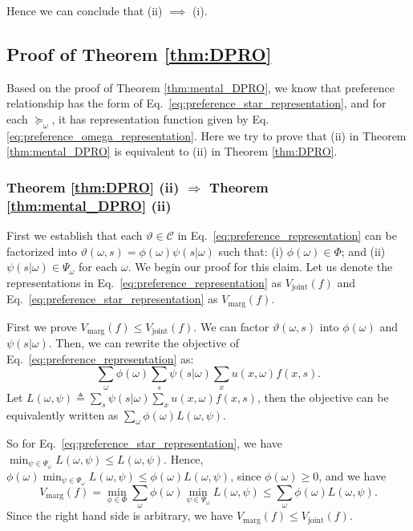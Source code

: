 \documentclass[11pt,oneside]{article}
\theoremstyle{plain}
\theoremstyle{plain}
\theoremstyle{plain}
\theoremstyle{plain}
\theoremstyle{plain}
\theoremstyle{definition}
\theoremstyle{definition}
\theoremstyle{remark}
\theoremstyle{plain}
\newcommand{\pfo}{\pf_\omega}
\newcommand{\pf}{\succeq}
\begin{document}
Hence we can conclude that (ii) $\implies$ (i).


\subsection{Proof of Theorem \ref{thm:DPRO}}
Based on the proof of Theorem \ref{thm:mental_DPRO}, we know that preference relationship has the form of Eq.~\eqref{eq:preference_star_representation}, and for each $\pfo$, it has representation function given by
Eq.\eqref{eq:preference_omega_representation}. Here we try to prove that (ii) in Theorem \ref{thm:mental_DPRO} is equivalent to (ii) in Theorem \ref{thm:DPRO}.

\subsubsection{Theorem \ref{thm:DPRO} (ii) $\Rightarrow$ Theorem \ref{thm:mental_DPRO} (ii)}

First we establish that each $\vartheta \in \mathcal{C}$ in Eq.~\eqref{eq:preference_representation} can be factorized into $\vartheta(\omega,s) = \phi(\omega)\psi(s|\omega)$ such that: (i) $\phi(\omega) \in \Phi$; and (ii) $\psi(s|\omega) \in \Psi_\omega$ for each $\omega$.
We begin our proof for this claim. Let us denote the representations in Eq.~\eqref{eq:preference_representation} as $V_{\text{joint}}(f)$ and Eq.~\eqref{eq:preference_star_representation} as $V_{\text{marg}}(f)$.

First we prove $V_{\text{marg}}(f) \leq V_{\text{joint}}(f)$.
We can factor $\vartheta(\omega,s)$ into $\phi(\omega)$ and $\psi(s|\omega)$. Then, we can rewrite the objective of Eq.~\eqref{eq:preference_representation} as:
$$
\sum_\omega \phi(\omega) \sum_s \psi(s|\omega)\sum_x u(x,\omega)f(x,s).
$$
Let $L(\omega,\psi)\triangleq\sum_s \psi(s|\omega)\sum_x u(x,\omega)f(x,s)$, then the objective can be equivalently written as $\sum_\omega \phi(\omega)L(\omega,\psi)$.

So for Eq.~\eqref{eq:preference_star_representation}, we have $\min_{\psi \in \Psi_\omega}L(\omega,\psi) \leq L(\omega,\psi)$. Hence, $\phi(\omega)\min_{\psi \in \Psi_\omega}L(\omega,\psi) \leq \phi(\omega ) L(\omega,\psi)$, since $\phi(\omega) \geq 0$, and we have 
\[
V_{\text{marg}}(f) = \min_{\phi \in \Phi} \sum_{\omega}\phi(\omega)\min_{\psi \in \Psi_\omega}L(\omega,\psi) \leq \sum_{\omega}\phi(\omega)L(\omega,\psi).
\]
Since the right hand side is arbitrary, we have $V_{\text{marg}}(f) \leq V_{\text{joint}}(f)$.
\end{document}
